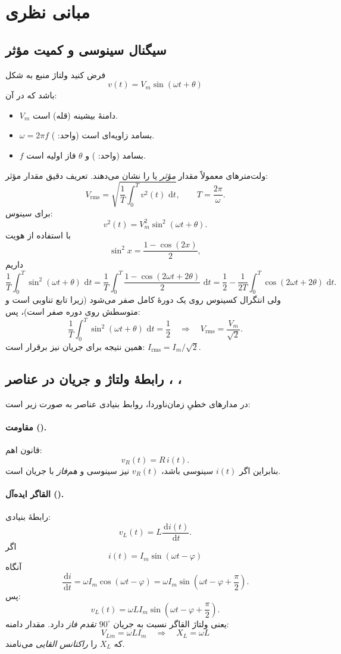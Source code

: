 \documentclass[a4paper,11pt]{article}
\newcommand{\lrms}{\lr{rms}}
\newcommand{\dd}{\,\mathrm{d}}
\begin{document}
\section{مبانی نظری}
\subsection{سیگنال سینوسی و کمیت مؤثر }
فرض کنید ولتاژ منبع به شکل
\[
v(t)=V_m\sin(\omega t+\theta)
\]
باشد که در آن:
\begin{itemize}
\item $V_m$ دامنهٔ بیشینه (قله) است.
\item $\omega=2\pi f$ بسامد زاویه‌ای است (واحد: ).
\item $f$ بسامد (واحد: ) و $\theta$ فاز اولیه است.
\end{itemize}

ولت‌مترهای  معمولاً مقدار \emph{مؤثر} یا \lrms{} را نشان می‌دهند. تعریف دقیق مقدار مؤثر:
\[
V_{\text{rms}}=\sqrt{\frac{1}{T}\int_{0}^{T} v^2(t)\,\dd t},\qquad T=\frac{2\pi}{\omega}.
\]
برای سینوس:
\[
v^2(t)=V_m^2\sin^2(\omega t+\theta).
\]
با استفاده از هویت
\[
\sin^2 x=\frac{1-\cos(2x)}{2},
\]
داریم
\[
\frac{1}{T}\int_0^T \sin^2(\omega t+\theta)\,\dd t
=\frac{1}{T}\int_0^T \frac{1-\cos(2\omega t+2\theta)}{2}\,\dd t
=\frac{1}{2}-\frac{1}{2T}\int_0^T \cos(2\omega t+2\theta)\,\dd t.
\]
ولی انتگرال کسینوس روی یک دورهٔ کامل صفر می‌شود (زیرا تابع تناوبی است و متوسطش روی دوره صفر است)، پس:
\[
\frac{1}{T}\int_0^T \sin^2(\omega t+\theta)\,\dd t=\frac{1}{2}
\quad\Rightarrow\quad
V_{\text{rms}}=\frac{V_m}{\sqrt{2}}.
\]
همین نتیجه برای جریان نیز برقرار است: $I_{\text{rms}}=I_m/\sqrt{2}$.

\subsection{رابطهٔ ولتاژ و جریان در عناصر ، ، }
در مدارهای خطیِ زمان‌ناوردا، روابط بنیادی عناصر به صورت زیر است:

\paragraph{مقاومت ().}
قانون اهم:
\[
v_R(t)=R\,i(t).
\]
بنابراین اگر $i(t)$ سینوسی باشد، $v_R(t)$ نیز سینوسی و \emph{هم‌فاز} با جریان است.

\paragraph{القاگر ایده‌آل ().}
رابطهٔ بنیادی:
\[
v_L(t)=L\frac{\dd i(t)}{\dd t}.
\]
اگر
\[
i(t)=I_m\sin(\omega t-\varphi)
\]
آنگاه
\[
\frac{\dd i}{\dd t}=\omega I_m\cos(\omega t-\varphi)=\omega I_m\sin\!\left(\omega t-\varphi+\frac{\pi}{2}\right).
\]
پس:
\[
v_L(t)=\omega L I_m\sin\!\left(\omega t-\varphi+\frac{\pi}{2}\right).
\]
یعنی ولتاژ القاگر نسبت به جریان \emph{$90^\circ$ تقدم فاز} دارد. مقدار دامنه:
\[
V_{Lm}=\omega L I_m \quad\Rightarrow\quad X_L=\omega L
\]
که $X_L$ را \emph{راکتانس القایی} می‌نامند.
\end{document}
